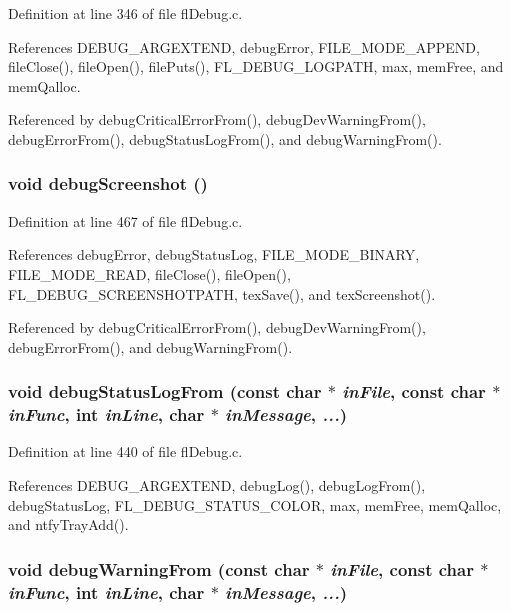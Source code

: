 Definition at line 346 of file fl\-Debug.c.

References DEBUG\_\-ARGEXTEND, debug\-Error, FILE\_\-MODE\_\-APPEND, file\-Close(), file\-Open(), file\-Puts(), FL\_\-DEBUG\_\-LOGPATH, max, mem\-Free, and mem\-Qalloc.

Referenced by debug\-Critical\-Error\-From(), debug\-Dev\-Warning\-From(), debug\-Error\-From(), debug\-Status\-Log\-From(), and debug\-Warning\-From().
\subsubsection{\setlength{\rightskip}{0pt plus 5cm}void debug\-Screenshot ()}\label{flDebug_8h_0ff85d5de01d6b009ced35171955ea39}




Definition at line 467 of file fl\-Debug.c.

References debug\-Error, debug\-Status\-Log, FILE\_\-MODE\_\-BINARY, FILE\_\-MODE\_\-READ, file\-Close(), file\-Open(), FL\_\-DEBUG\_\-SCREENSHOTPATH, tex\-Save(), and tex\-Screenshot().

Referenced by debug\-Critical\-Error\-From(), debug\-Dev\-Warning\-From(), debug\-Error\-From(), and debug\-Warning\-From().
\subsubsection{\setlength{\rightskip}{0pt plus 5cm}void debug\-Status\-Log\-From (const char $\ast$ {\em in\-File}, const char $\ast$ {\em in\-Func}, int {\em in\-Line}, char $\ast$ {\em in\-Message},  {\em ...})}\label{flDebug_8h_3a1508e1b415b6a03753a186799d5258}




Definition at line 440 of file fl\-Debug.c.

References DEBUG\_\-ARGEXTEND, debug\-Log(), debug\-Log\-From(), debug\-Status\-Log, FL\_\-DEBUG\_\-STATUS\_\-COLOR, max, mem\-Free, mem\-Qalloc, and ntfy\-Tray\-Add().
\subsubsection{\setlength{\rightskip}{0pt plus 5cm}void debug\-Warning\-From (const char $\ast$ {\em in\-File}, const char $\ast$ {\em in\-Func}, int {\em in\-Line}, char $\ast$ {\em in\-Message},  {\em ...})}\label{flDebug_8h_8ae2b8f15c4362510e8ea880ca4f688c}





